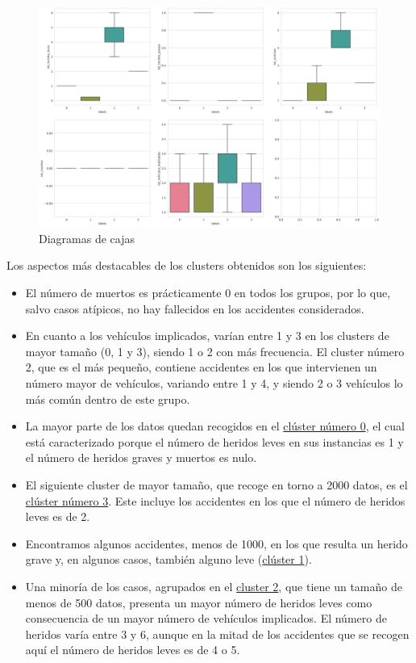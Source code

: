 \documentclass[a4paper,11pt]{book}
\begin{document}
\begin{figure}[H]
	\centering
	\caption[]{Diagramas de cajas}
	\label{fig:cajas6}
	\includegraphics[width=1.1\linewidth]{img/cajas6}
\end{figure}

Los aspectos más destacables de los clusters obtenidos son los siguientes:
\begin{itemize}
	\item El número de muertos es prácticamente 0 en todos los grupos, por lo que, salvo casos atípicos, no hay fallecidos en los accidentes considerados.
	\item En cuanto a los vehículos implicados, varían entre 1 y 3 en los clusters de mayor tamaño (0, 1 y 3), siendo 1 o 2 con más frecuencia. El cluster número 2, que es el más pequeño, contiene accidentes en los que intervienen un número mayor de vehículos, variando entre 1 y 4, y siendo 2 o 3  vehículos lo más común dentro de este grupo.
	\item La mayor parte de los datos quedan recogidos en el \underline{clúster número 0}, el cual está caracterizado porque el número de heridos leves en sus instancias es 1 y el número de heridos graves y muertos es nulo. 
	\item El siguiente cluster de mayor tamaño, que recoge en torno a 2000 datos, es el \underline{clúster número 3}. Este incluye los accidentes en los que el número de heridos leves es de 2.
	\item Encontramos algunos accidentes, menos de 1000, en los que resulta un herido grave y, en algunos casos, también alguno leve (\underline{clúster 1}).
	\item Una minoría de los casos, agrupados en el \underline{cluster 2}, que tiene un tamaño de menos de 500 datos, presenta un mayor número de heridos leves como consecuencia de un mayor número de vehículos implicados. El número de heridos varía entre 3 y 6, aunque en la mitad de los accidentes que se recogen aquí el número de heridos leves es de 4 o 5. 
\end{itemize}
\newpage
\end{document}
